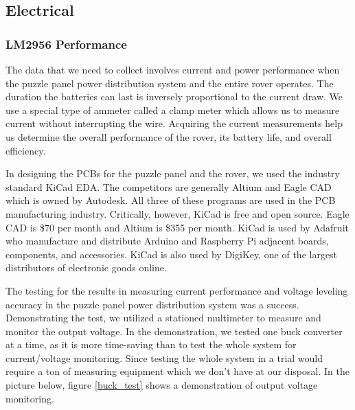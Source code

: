 \documentclass[a4paper, 10pt]{article}
\begin{document}
	\subsection{Electrical}

	\subsubsection*{LM2956 Performance}	

	The data that we need to collect involves current and power performance when the puzzle panel power distribution system and the entire rover operates. The duration the batteries can last is inversely proportional to the current draw. We use a special type of ammeter called a clamp meter which allows us to measure current without interrupting the wire. Acquiring the current measurements help  us determine the overall performance of the rover, its battery life, and overall efficiency.

    In designing the PCBs for the puzzle panel and the rover, we used the industry standard KiCad EDA. The competitors are generally Altium and Eagle CAD which is owned by Autodesk. All three of these programs are used in the PCB manufacturing industry. Critically, however, KiCad is free and open source. Eagle CAD is \$70 per month and Altium is \$355 per month. KiCad is used by Adafruit who manufacture and distribute Arduino and Raspberry Pi adjacent boards, components, and accessories. KiCad is also used by DigiKey, one of the largest distributors of electronic goods online.

    The testing for the results in measuring current performance and voltage leveling accuracy in the puzzle panel power distribution system was a success. Demonstrating the test, we utilized a stationed multimeter to measure and monitor the output voltage. In the demonstration, we tested one buck converter at a time, as it is more time-saving than to test the whole system for current/voltage monitoring. Since testing the whole system in a trial would require a ton of measuring equipment which we don't have at our disposal. In the picture below, figure \ref{buck_test} shows a demonstration of output voltage monitoring.  
\end{document}
